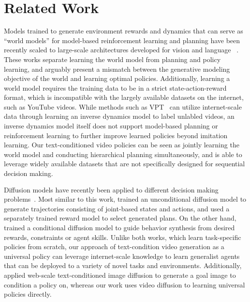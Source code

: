 \section{Related Work}\label{sec:related}

 Models trained to generate environment rewards and dynamics that can serve as ``world models'' for model-based reinforcement learning and planning have been recently scaled to large-scale architectures developed for vision and language ~\citep{hafner2020mastering,janner2021offline,zhang2021autoregressive,micheli2022transformers}. These works separate learning the world model from planning and policy learning, and arguably present a mismatch between the generative modeling objective of the world and learning optimal policies. Additionally, learning a world model requires the training data to be in a strict state-action-reward format, which is incompatible with the largely available datasets on the internet, such as YouTube videos. While methods such as VPT~\citep{baker2022video} can utilize internet-scale data through learning an inverse dynamics model to label unlabled videos, an inverse dynamics model itself does not support model-based planning or reinforcement learning to further improve learned policies beyond imitation learning. Our text-conditioned video policies can be seen as jointly learning the world model and conducting hierarchical planning simultaneously, and is able to leverage widely available datasets that are not specifically designed for sequential decision making. 

Diffusion models have recently been applied to different decision making problems~\citep{janner2022planning,ajay2022conditional,wang2022diffusion, zhang2022lad, urain2022se, zhong2022guided}. 
Most similar to this work, \citet{janner2022planning} trained an unconditional diffusion model to generate trajectories consisting of joint-based states and actions, and used a separately trained reward model to select generated plans. On the other hand, \citet{ajay2022conditional} %
trained a conditional diffusion model to guide behavior synthesis from desired rewards, constraints or agent skills. Unlike both works, which learn task-specific policies from scratch, our approach of text-condition video generation as a universal policy can leverage internet-scale knowledge to learn generalist agents that can be deployed to a variety of novel tasks and environments. Additionally, \citet{kapelyukh2022dall} applied web-scale text-conditioned image diffusion to generate a goal image to condition a policy on, whereas our work uses video diffusion to learning universal policies directly.

